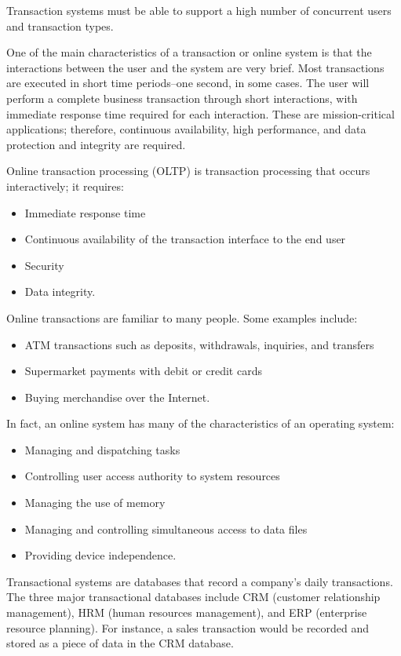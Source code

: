 Transaction systems must be able to support a high number of concurrent users and transaction types.
\par
One of the main characteristics of a transaction or online system is that the interactions between the user and the system are very brief. Most transactions are executed in short time periods--one second, in some cases. The user will perform a complete business transaction through short interactions, with immediate response time required for each interaction. These are mission-critical applications; therefore, continuous availability, high performance, and data protection and integrity are required.
\par
Online transaction processing (OLTP) is transaction processing that occurs interactively; it requires:
\begin{itemize}
\item Immediate response time
\item Continuous availability of the transaction interface to the end user
\item Security
\item Data integrity.
\end{itemize}
Online transactions are familiar to many people. Some examples include:
\begin{itemize}
\item ATM transactions such as deposits, withdrawals, inquiries, and transfers
\item Supermarket payments with debit or credit cards
\item Buying merchandise over the Internet.
\end{itemize}
\par
In fact, an online system has many of the characteristics of an operating system:
\begin{itemize}
\item Managing and dispatching tasks
\item Controlling user access authority to system resources
\item Managing the use of memory
\item Managing and controlling simultaneous access to data files
\item Providing device independence.
\end{itemize}
\par
Transactional systems are databases that record a company’s daily transactions. The three major transactional databases include CRM (customer relationship management), HRM (human resources management), and ERP (enterprise resource planning). For instance, a sales transaction would be recorded and stored as a piece of data in the CRM database.
